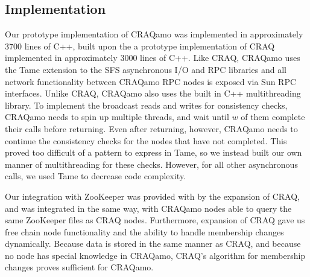 \subsection{Implementation}
Our prototype implementation of CRAQamo was implemented in approximately 3700 lines of C++,
built upon the a prototype implementation of CRAQ implemented in approximately 3000 lines of C++.
Like CRAQ, CRAQamo uses the Tame \cite{tame} extension to the SFS asynchronous I/O and RPC libraries \cite{sfs} and all network functionality between CRAQamo RPC nodes is exposed via Sun RPC interfaces.
Unlike CRAQ, CRAQamo also uses the built in C++ multithreading library.
To implement the broadcast reads and writes for consistency checks, CRAQamo needs to spin up multiple threads, and wait until $w$ of them complete their calls before returning.
Even after returning, however, CRAQamo needs to continue the consistency checks for the nodes that have not completed.
This proved too difficult of a pattern to express in Tame, so we instead built our own manner of multithreading for these checks.
However, for all other asynchronous calls, we used Tame to decrease code complexity.

Our integration with ZooKeeper was provided with by the expansion of CRAQ, and was integrated in the same way, with CRAQamo nodes able to query the same ZooKeeper files as CRAQ nodes.
Furthermore, expansion of CRAQ gave us free chain node functionality and the ability to handle membership changes dynamically.
Because data is stored in the same manner as CRAQ, and because no node has special knowledge in CRAQamo, CRAQ's algorithm for membership changes proves sufficient for CRAQamo.
